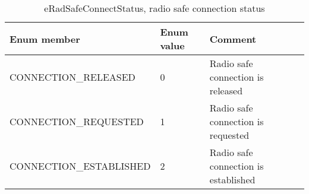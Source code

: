 \documentclass{template/openetcs_article}
\begin{document}
\begin{longtable}{|l|l|l|}
	\caption{eRadSafeConnectStatus, radio safe connection status} \\ 
	\hline
		\begin{minipage}[t]{0.45\linewidth} \textbf{Enum member}	\end{minipage}
	&	\begin{minipage}[t]{0.10\linewidth} \textbf{Enum value}	\end{minipage} 
	&	\begin{minipage}[t]{0.50\linewidth} \textbf{Comment} \end{minipage} \\
	\hline
		\begin{minipage}[t]{0.45\linewidth} CONNECTION\_RELEASED \end{minipage} 
	&	\begin{minipage}[t]{0.10\linewidth} 0 \end{minipage} 
	&	\begin{minipage}[t]{0.50\linewidth} Radio safe connection is released\end{minipage}\\
	\hline
		\begin{minipage}[t]{0.45\linewidth} CONNECTION\_REQUESTED \end{minipage} 
	&	\begin{minipage}[t]{0.10\linewidth} 1 \end{minipage} 
	&	\begin{minipage}[t]{0.50\linewidth} Radio safe connection is requested \end{minipage}\\
	\hline
		\begin{minipage}[t]{0.45\linewidth} CONNECTION\_ESTABLISHED \end{minipage} 
	&	\begin{minipage}[t]{0.10\linewidth} 2 \end{minipage} 
	&	\begin{minipage}[t]{0.50\linewidth} Radio safe connection is established\end{minipage}\\
	\hline
\end{longtable}
\end{document}
